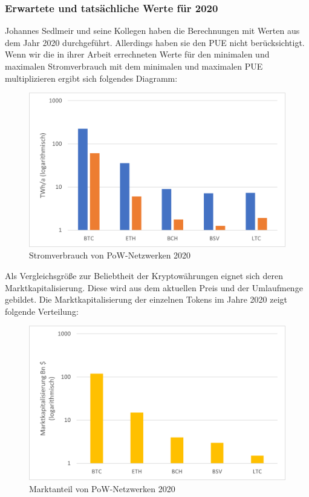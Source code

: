 \documentclass[12pt]{article}
\begin{document}
\subsubsection{Erwartete und tatsächliche Werte für 2020}
Johannes Sedlmeir und seine Kollegen haben die Berechnungen mit Werten aus dem Jahr 2020 durchgeführt. Allerdings haben sie den PUE nicht berücksichtigt. Wenn wir die in ihrer Arbeit errechneten Werte für den minimalen und maximalen Stromverbrauch mit dem minimalen und maximalen PUE multiplizieren ergibt sich folgendes Diagramm:
\FloatBarrier
\begin{figure}[ht!]
    \centering
    \includegraphics[width=.75\textwidth]{quellen/pow_2020.png}
    \caption{Stromverbrauch von PoW-Netzwerken 2020}
\end{figure}
\FloatBarrier
\clearpage
\noindent Als Vergleichsgröße zur Beliebtheit der Kryptowährungen eignet sich deren Marktkapitalisierung. Diese wird aus dem aktuellen Preis und der Umlaufmenge gebildet. Die Marktkapitalisierung der einzelnen Tokens im Jahre 2020 zeigt folgende Verteilung:
\FloatBarrier
\begin{figure}[ht!]
    \centering
    \includegraphics[width=.75\textwidth]{quellen/pow_mkp_2020.png}
    \caption{Marktanteil von PoW-Netzwerken 2020}
\end{figure}
\FloatBarrier
\end{document}
